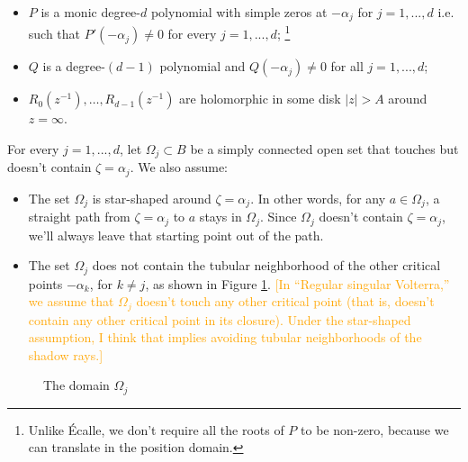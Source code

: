 \documentclass{article}
\theoremstyle{definition}
\begin{document}
\begin{itemize}
\item $P$ is a monic degree-$d$ polynomial with simple zeros at $-\alpha_j$ for $j=1,...,d$ i.e. such that $P'(-\alpha_j)\neq 0$ for every $j=1,...,d$; \footnote{Unlike \'Ecalle, we don't require all the roots of $P$ to be non-zero, because  we can translate in the position domain.}
\item $Q$ is a degree-$(d-1)$ polynomial and $Q(-\alpha_j)\neq 0$ for all $j=1,...,d$;
\item $R_0(z^{-1}), \ldots, R_{d-1}(z^{-1})$ are holomorphic in some disk $|z| > A$ around $z = \infty$.
\end{itemize}

For every $j=1,...,d$, let $\Omega_j\subset B$ be a simply connected open set that touches but doesn't contain $\zeta = \alpha_j$. We also assume:
\begin{itemize}
\item The set $\Omega_j$ is star-shaped around $\zeta = \alpha_j$. In other words, for any $a \in \Omega_j$, a straight path from $\zeta = \alpha_j$ to $a$ stays in $\Omega_j$. Since $\Omega_j$ doesn't contain $\zeta = \alpha_j$, we'll always leave that starting point out of the path.
\item The set $\Omega_j$ does not contain the tubular neighborhood of the other critical points $-\alpha_k$, for $k\neq j$, as shown in Figure \ref{Fig:domain}. \textcolor{orange}{[In ``Regular singular Volterra,'' we assume that $\Omega_j$ doesn't touch any other critical point (that is, doesn't contain any other critical point in its closure). Under the star-shaped assumption, I think that implies avoiding tubular neighborhoods of the shadow rays.]}
\end{itemize}

\begin{figure}
\center
{}
\caption{The domain $\Omega_j$}\label{Fig:domain}
\end{figure}
\end{document}
